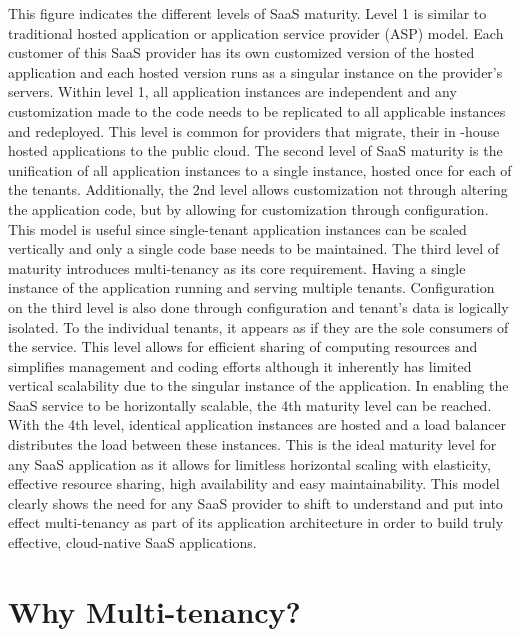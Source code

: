 
This figure indicates the different levels of SaaS maturity. Level 1 is similar to traditional hosted application or application service provider (ASP) model. Each customer of this SaaS provider has its own customized version of the hosted application and each hosted version runs as a singular instance on the provider's servers. Within level 1, all application instances are independent and any customization made to the code needs to be replicated to all applicable instances and redeployed. This level is common for providers that migrate, their in -house hosted applications to the public cloud. The second level of SaaS maturity is the unification of all application instances to a single instance, hosted once for each of the tenants. Additionally, the 2nd level allows customization not through altering the application code, but by allowing for customization through configuration. This model is useful since single-tenant application instances can be scaled vertically and only a single code base needs to be maintained. The third level of maturity introduces multi-tenancy as its core requirement. Having a single instance of the application running and serving multiple tenants. Configuration on the third level is also done through configuration and tenant's data is logically isolated. To the individual tenants, it appears as if they are the sole consumers of the service. This level allows for efficient sharing of computing resources and simplifies management and coding efforts although it inherently has limited vertical scalability due to the singular instance of the application. In enabling the SaaS service to be horizontally scalable, the 4th maturity level can be reached. With the 4th level, identical application instances are hosted and a load balancer distributes the load between these instances. This is the ideal maturity level for any SaaS application as it allows for limitless horizontal scaling with elasticity, effective resource sharing, high availability and easy maintainability. This model clearly shows the need for any SaaS provider to shift to understand and put into effect multi-tenancy as part of its application architecture in order to build truly effective, cloud-native SaaS applications.

\section{Why Multi-tenancy?}

